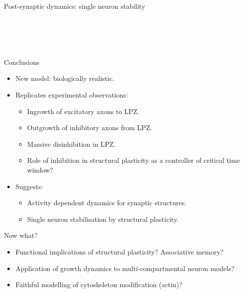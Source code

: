 \begin{frame}[c]{Post-synaptic dynamics: single neuron stability}
  \begin{columns}
    \begin{column}{0.5\textwidth}
      \begin{figure}[h]
        \centering
        \resizebox{\textwidth}{!}{}%
      \end{figure}
    \end{column}
    \begin{column}{0.5\textwidth}
      \begin{figure}[h]
        \centering
        \resizebox{0.9\textwidth}{!}{}\\%
        \resizebox{0.9\textwidth}{!}{}\\%
      \end{figure}
    \end{column}
  \end{columns}
\end{frame}
\begin{frame}[c]{Conclusions}
  \begin{itemize}
    \item New model: biologically realistic.
    \item Replicates experimental observations:
      \begin{itemize}
        \item Ingrowth of excitatory axons to LPZ\@.
        \item Outgrowth of inhibitory axons from LPZ\@.
          \pause{}
        \item Massive disinhibition in LPZ\@.
        \item Role of inhibition in structural plasticity as a controller of critical time window?
      \end{itemize}
      \pause{}
    \item Suggests:
      \begin{itemize}
        \item Activity dependent dynamics for synaptic structures.
        \item Single neuron stabilisation by structural plasticity.
      \end{itemize}
  \end{itemize}
\end{frame}
\begin{frame}[c]{Now what?}
  \begin{itemize}
    \item Functional implications of structural plasticity? Associative memory?
      \pause{}
    \item Application of growth dynamics to multi-compartmental neuron models?
      \pause{}
    \item Faithful modelling of cytoskeleton modification (actin)?
  \end{itemize}
\end{frame}

